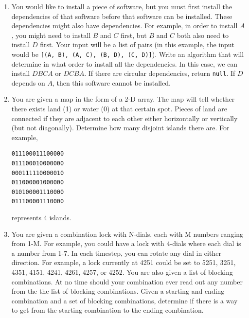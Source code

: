 \documentclass{article}
\begin{document}
\begin{enumerate}
\item You would like to install a piece of software, but you must first install the dependencies of that software before that software can be installed. These dependencies might also have dependencies. For example, in order to install $A$, you might need to install $B$ and $C$ first, but $B$ and $C$ both also need to install $D$ first. Your input will be a list of pairs (in this example, the input would be \texttt{[(A, B), (A, C), (B, D), (C, D)]}). Write an algorithm that will determine in what order to install all the dependencies. In this case, we can install $DBCA$ or $DCBA$. If there are circular dependencies, return \texttt{null}. If $D$ depends on $A$, then this software cannot be installed.

\item You are given a map in the form of a 2-D array. The map will tell whether there exists land (1) or water (0) at that certain spot. Pieces of land are connected if they are adjacent to each other either horizontally or vertically (but not diagonally). Determine how many disjoint islands there are. For example,
\begin{lstlisting}
011100011100000
011100010000000
000111110000010
011000001000000
010100001110000
011100001110000
\end{lstlisting}
represents 4 islands.

\item You are given a combination lock with N-dials, each with M numbers ranging from 1-M. For example, you could have a lock with 4-dials where each dial is a number from 1-7. In each timestep, you can rotate any dial in either direction. For example, a lock currently at 4251 could be set to 5251, 3251, 4351, 4151, 4241, 4261, 4257, or 4252. You are also given a list of blocking combinations. At no time should your combination ever read out any number from the the list of blocking combinations. Given a starting and ending combination and a set of blocking combinations, determine if there is a way to get from the starting combination to the ending combination.
\end{enumerate}
\end{document}
